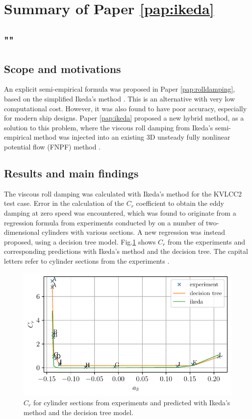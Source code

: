 \section{Summary of Paper \ref{pap:ikeda}}
\subsection*{""}
\subsection*{Scope and motivations}
An explicit semi-empirical formula was proposed in Paper \ref{pap:rolldamping}, based on the simplified Ikeda's method \cite{kawaharaSimplePredictionFormula2011}. This is an alternative with very low computational cost. However, it was also found to have poor accuracy, especially for modern ship designs. 
Paper \ref{pap:ikeda} proposed a new hybrid method, as a solution to this problem, where the viscous roll damping from Ikeda’s semi-empirical method was injected into an existing 3D unsteady fully nonlinear potential flow (FNPF) method \cite{kjellbergFullyNonlinearUnsteady2013}.

\subsection*{Results and main findings}
The viscous roll damping was calculated with Ikeda's method \cite{ikedaComponentsRollDamping1978} for the KVLCC2 test case. Error in the calculation of the $C_r$ coefficient to obtain the eddy damping at zero speed was encountered, which was found to originate from a regression formula from experiments conducted by \textcite{ikedaEddyMakingComponent1978} on a number of two-dimensional cylinders with various sections. A new regression was instead proposed, using a decision tree model.
Fig.\ref{fig:ikeda_sections} shows $C_r$ from the experiments and corresponding predictions with Ikeda's method and the decision tree. The capital letters refer to cylinder sections from the experiments
\cite{ikedaEddyMakingComponent1978}.
\begin{figure}[h]
\center
\includegraphics[width=\textwidth]{figures/ikeda_sections.pdf}
\vspace{-0.4cm}
\caption{$C_r$ for cylinder sections from experiments and predicted with Ikeda's method and the decision tree model.}
\label{fig:ikeda_sections}
\end{figure}
\FloatBarrier

